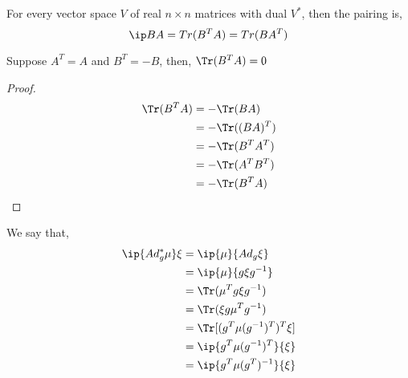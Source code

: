 \begin{ndefi}
  For every vector space $V$ of real $n\times n$ matrices with dual $V^*$, then the pairing is,
  $$ \ip B A = Tr(B^TA) = Tr(BA^T) $$
\end{ndefi}

\begin{nprop}
  Suppose $A^T = A$ and $B^T = -B$, then, $\Tr(B^TA) = 0$
\end{nprop}
\begin{proof}
  \begin{align*}
    \Tr(B^TA) &= -\Tr(BA)\\
    &= -\Tr((BA)^T)\\
    &= -\Tr(B^TA^T)\\
    &= -\Tr(A^TB^T)\\
    &= - \Tr(B^TA)
  \end{align*}
\end{proof}

We say that,
\begin{align*}
  \ip {Ad^*_g \mu} \xi &= \ip {\mu} {Ad_g\xi}\\
  &= \ip {\mu} {g\xi g^{-1}}\\
  &= \Tr(\mu^Tg\xi g^{-1})\\
  &= \Tr(\xi g\mu^Tg^{-1})\\
  &= \Tr [(g^T\mu(g^{-1})^T)^T\xi]\\
  &= \ip{g^T\mu (g^{-1})^T} {\xi}\\
  &= \ip{g^T\mu (g^T)^{-1}} {\xi}\\
\end{align*}
